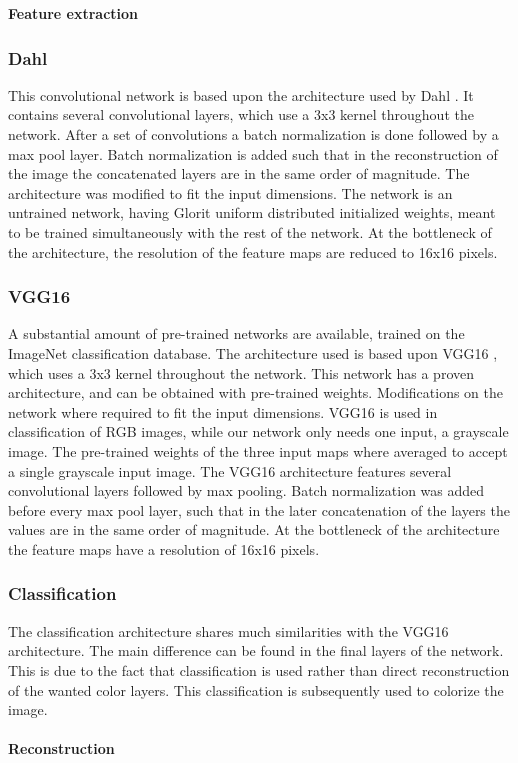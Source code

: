 {\color{red}
\textbf{Feature extraction}


\subsubsection{Dahl}%


This convolutional network is based upon the architecture used by Dahl \cite{Dahl}. It contains several convolutional layers, which use a 3x3 kernel throughout the network. After a set of convolutions a batch normalization is done followed by a max pool layer. Batch normalization is added such that in the reconstruction of the image the concatenated layers are in the same order of magnitude. The architecture was modified to fit the input dimensions. The network is an untrained network, having Glorit uniform distributed \cite{Glorot} initialized weights, meant to be trained simultaneously with the rest of the network. At the bottleneck of the architecture, the resolution of the feature maps are reduced to 16x16 pixels.
 

\subsubsection{VGG16}
A substantial amount of pre-trained networks are available, trained on the ImageNet classification database. The architecture used is based upon VGG16 \cite{Simonyan}, which uses a 3x3 kernel throughout the network. This network has a proven architecture, and can be obtained with pre-trained weights. Modifications on the network where required to fit the input dimensions. VGG16 is used in classification of RGB images, while our network only needs one input, a grayscale image. The pre-trained weights of the three input maps where averaged to accept a single grayscale input image. The VGG16 architecture features several convolutional layers followed by max pooling. Batch normalization was added before every max pool layer, such that in the later concatenation of the layers the values are in the same order of magnitude. At the bottleneck of the architecture the feature maps have a resolution of 16x16 pixels. 

\subsubsection{Classification}
The classification architecture shares much similarities with the VGG16 architecture. The main difference can be found in the final layers of the network. This is due to the fact that classification is used rather than direct reconstruction of the wanted color layers. This classification is subsequently used to colorize the image. \\
\\
\textbf{Reconstruction}

}
